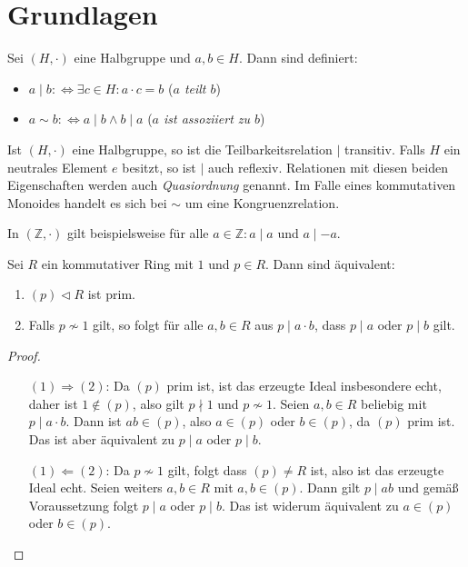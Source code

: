 \section{Grundlagen}

\begin{definition}
    Sei $(H,\cdot)$ eine Halbgruppe und $a,b\in H$. Dann sind definiert:
    \begin{itemize}
        \item $a\mid b:\Leftrightarrow \exists c\in H:a\cdot c=b$ \tab (\emph{$a$ teilt $b$})
        \item $a\sim b:\Leftrightarrow a\mid b\land b\mid a$ \tab (\emph{$a$ ist assoziiert zu $b$})
    \end{itemize}
\end{definition}

\begin{remark}
    Ist $(H,\cdot)$ eine Halbgruppe, so ist die Teilbarkeitsrelation $\mid$ transitiv.
    Falls $H$ ein neutrales Element $e$ besitzt, so ist $\mid$ auch reflexiv. Relationen mit diesen beiden Eigenschaften
    werden auch \emph{Quasiordnung} genannt. Im Falle eines kommutativen Monoides handelt es sich bei
    $\sim$ um eine Kongruenzrelation.
\end{remark}

\begin{example}
    In $(\mathbb{Z},\cdot)$ gilt beispielsweise für alle $a\in\mathbb{Z}:a\mid a$ und $a\mid -a$. 
\end{example}

\begin{proposition}
    Sei $R$ ein kommutativer Ring mit $1$ und $p\in R$. Dann sind äquivalent:
    \begin{enumerate}
        \item $(p)\vartriangleleft R$ ist prim.
        \item Falls $p\not\sim 1$ gilt, so folgt für alle $a,b\in R$
        aus $p\mid a\cdot b$, dass $p\mid a$ oder $p\mid b$ gilt.
    \end{enumerate}
\end{proposition}

\begin{proof}{\ }
    \begin{itemize}[leftmargin=2.5cm] 
        \item[$(1) \Rightarrow (2)$:]Da $(p)$ prim ist, ist das erzeugte Ideal insbesondere echt, daher ist $1\not\in (p)$, also gilt $p \nmid 1$ und $p\not\sim 1$.
        Seien $a,b\in R$ beliebig mit $p\mid a\cdot b$. Dann ist $ab\in (p)$, also $a\in(p)$ oder $b\in(p)$, da $(p)$ prim ist.
        Das ist aber äquivalent zu $p\mid a$ oder $p\mid b$.
        \item[$(1) \Leftarrow (2)$:]Da $p\not\sim 1$ gilt, folgt dass $(p)\neq R$ ist, also ist das erzeugte Ideal echt.
        Seien weiters $a,b\in R$ mit $a,b\in (p)$. Dann gilt $p\mid ab$ und gemäß Voraussetzung folgt $p\mid a$ oder $p\mid b$.
        Das ist widerum äquivalent zu $a\in(p)$ oder $b\in(p)$.
    \end{itemize}
\end{proof}


